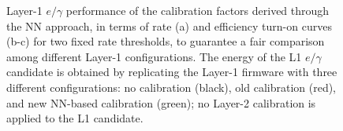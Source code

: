 \begin{figure}
    \centering
    
    \caption{Layer-1 $e/\gamma$ performance of the calibration factors derived through the NN approach, in terms of rate (a) and efficiency turn-on curves (b-c) for two fixed rate thresholds, to guarantee a fair comparison among different Layer-1 configurations. The energy of the L1 $e/\gamma$ candidate is obtained by replicating the Layer-1 firmware with three different configurations: no calibration (black), old calibration (red), and new NN-based calibration (green); no Layer-2 calibration is applied to the L1 candidate.}
    \label{fig:NN_ECAL_TurnOn}
\end{figure}

